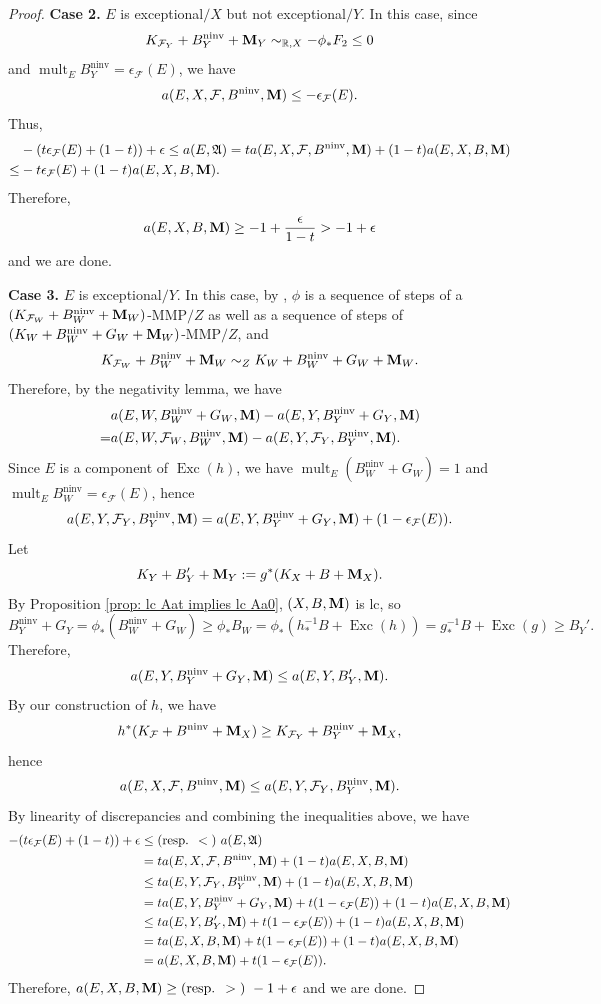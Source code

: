 \documentclass[12pt]{amsart}
\numberwithin{equation}{section}
\newcommand{\Mm}{{\bf{M}}}
\newcommand{\Exc}{\operatorname{Exc}}
\newcommand{\ninv}{\operatorname{ninv}}
\newcommand{\mult}{\operatorname{mult}}
\newcommand{\Aa}{{\mathfrak{A}}}
\newcommand{\Ff}{\mathcal{F}}
\theoremstyle{definition}
\theoremstyle{definition}
\theoremstyle{definition}
\begin{document}
\begin{proof}
\medskip

\noindent\textbf{Case 2.} $E$ is exceptional$/X$ but not exceptional$/Y$. In this case, since
$$K_{\Ff_Y}+B_Y^{\ninv}+\Mm_Y\sim_{\mathbb R,X}-\phi_*F_2\leq 0$$
and $\mult_EB_Y^{\ninv}=\epsilon_{\Ff}(E)$, we have $$a(E,X,\Ff,B^{\ninv},\Mm)\leq -\epsilon_{\Ff}(E).$$
Thus,
\begin{align*}
  & -(t\epsilon_{\Ff}(E)+(1-t))+\epsilon\leq a(E,\Aa)=ta(E,X,\Ff,B^{\ninv},\Mm)+(1-t)a(E,X,B,\Mm)\\
   \leq &-t\epsilon_{\Ff}(E)+(1-t)a(E,X,B,\Mm).
\end{align*}
Therefore, 
$$a(E,X,B,\Mm)\geq -1+\frac{\epsilon}{1-t}>-1+\epsilon$$
and we are done.
\medskip

\noindent\textbf{Case 3.} $E$ is exceptional$/Y$. In this case, by \cite[Proposition 7.3.6, Lemma 9.1.4]{CHLX23},  $\phi$ is a sequence of steps of a $(K_{\Ff_W}+B_W^{\ninv}+\Mm_W)$-MMP$/Z$ as well as a sequence of steps of $(K_W+B_W^{\ninv}+G_W+\Mm_W)$-MMP$/Z$, and 
$$K_{\Ff_W}+B_W^{\ninv}+\Mm_W\sim_{Z}K_W+B_W^{\ninv}+G_W+\Mm_W.$$
Therefore, by the negativity lemma, we have
\begin{align*}
    &a(E,W,B_W^{\ninv}+G_W,\Mm)-a(E,Y,B_Y^{\ninv}+G_Y,\Mm)\\
    =&a(E,W,\Ff_W,B_W^{\ninv},\Mm)-a(E,Y,\Ff_Y,B_Y^{\ninv},\Mm).
\end{align*}
Since $E$ is a component of $\Exc(h)$, we have $\mult_E(B_W^{\ninv}+G_W)=1$ and $\mult_EB_W^{\ninv}=\epsilon_{\Ff}(E)$, hence
$$a(E,Y,\Ff_Y,B_Y^{\ninv},\Mm)=a(E,Y,B_Y^{\ninv}+G_Y,\Mm)+(1-\epsilon_{\Ff}(E)).$$
Let
$$K_Y+B_Y'+\Mm_Y:=g^*(K_X+B+\Mm_X).$$
By Proposition \ref{prop: lc Aat implies lc Aa0}, $(X,B,\Mm)$ is lc, so 
$$B_Y^{\ninv}+G_Y=\phi_*(B_W^{\ninv}+G_W)\geq\phi_*B_W=\phi_*(h^{-1}_*B+\Exc(h))=g^{-1}_*B+\Exc(g)\geq B_Y'.$$
Therefore,
$$a(E,Y,B_Y^{\ninv}+G_Y,\Mm)\leq a(E,Y,B_Y',\Mm).$$
By our construction of $h$, we have
$$h^*(K_{\Ff}+B^{\ninv}+\Mm_X)\geq K_{\Ff_Y}+B_Y^{\ninv}+\Mm_X,$$
hence
$$a(E,X,\Ff,B^{\ninv},\Mm)\leq a(E,Y,\Ff_Y,B_Y^{\ninv},\Mm).$$
By linearity of discrepancies and combining the inequalities above, we have
\begin{align*}
-(t\epsilon_{\Ff}(E)+(1-t))+\epsilon&\leq \text{(resp. }<\text{) } a(E,\Aa)\\
&=ta(E,X,\Ff,B^{\ninv},\Mm)+(1-t)a(E,X,B,\Mm)\\
&\leq ta(E,Y,\Ff_Y,B_Y^{\ninv},\Mm)+(1-t)a(E,X,B,\Mm)\\
&=ta(E,Y,B_Y^{\ninv}+G_Y,\Mm)+t(1-\epsilon_{\Ff}(E))+(1-t)a(E,X,B,\Mm)\\
&\leq ta(E,Y,B_Y',\Mm)+t(1-\epsilon_{\Ff}(E))+(1-t)a(E,X,B,\Mm)\\
&= ta(E,X,B,\Mm)+t(1-\epsilon_{\Ff}(E))+(1-t)a(E,X,B,\Mm)\\
&= a(E,X,B,\Mm)+t(1-\epsilon_{\Ff}(E)).
\end{align*}
Therefore, $a(E,X,B,\Mm)\geq \text{(resp. }>\text{) } -1+\epsilon$ and we are done.
\end{proof}
\end{document}
